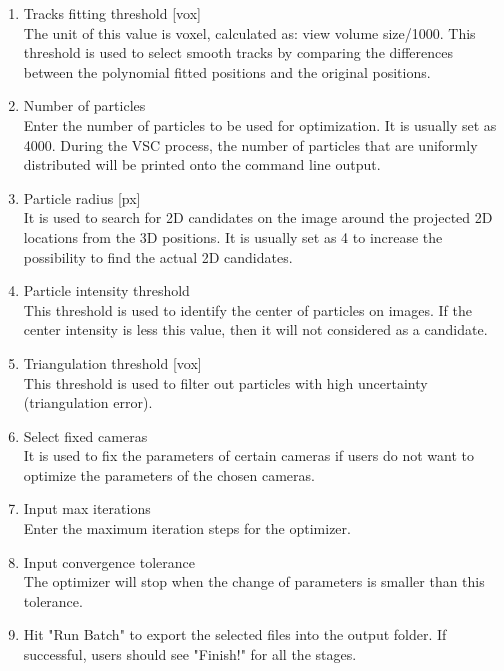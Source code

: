 \documentclass[a4paper,fleqn]{article}
\begin{document}
\begin{enumerate}
\begin{enumerate}
        \item Tracks fitting threshold [vox]\\
        The unit of this value is voxel, calculated as: view volume size/1000. This threshold is used to select smooth tracks by comparing the differences between the polynomial fitted positions and the original positions. 

        \item Number of particles\\
        Enter the number of particles to be used for optimization. It is usually set as 4000. During the VSC process, the number of particles that are uniformly distributed will be printed onto the command line output.

        \item Particle radius [px]\\
        It is used to search for 2D candidates on the image around the projected 2D locations from the 3D positions. It is usually set as 4 to increase the possibility to find the actual 2D candidates.

        \item Particle intensity threshold\\
        This threshold is used to identify the center of particles on images. If the center intensity is less this value, then it will not considered as a candidate.

        \item Triangulation threshold [vox]\\
        This threshold is used to filter out particles with high uncertainty (triangulation error). 
    
        \item Select fixed cameras\\
        It is used to fix the parameters of certain cameras if users do not want to optimize the parameters of the chosen cameras.

        \item Input max iterations\\
        Enter the maximum iteration steps for the optimizer.

        \item Input convergence tolerance\\ 
        The optimizer will stop when the change of parameters is smaller than this tolerance.

        \item Hit "Run Batch" to export the selected files into the output folder. If successful, users should see "Finish!" for all the stages.
    \end{enumerate}
    

\end{enumerate}
\end{document}
